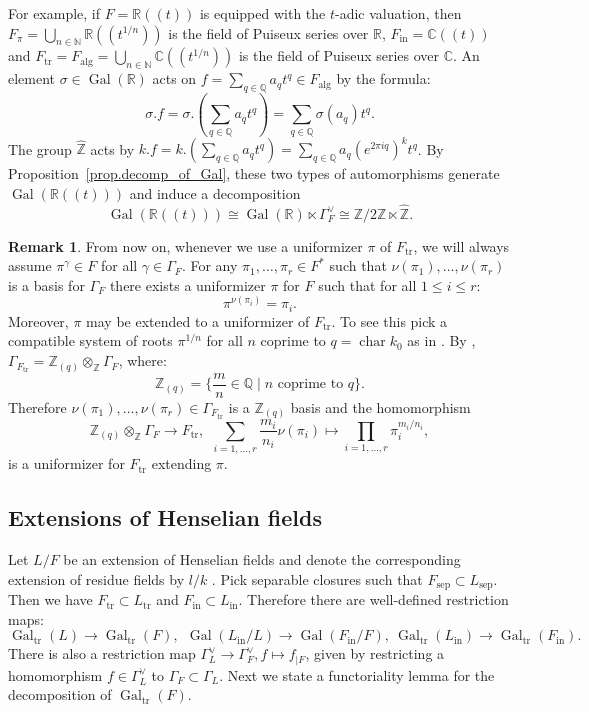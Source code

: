 \documentclass[12pt]{amsart}
\numberwithin{equation}{section}
\theoremstyle{definition}
\newtheorem{remark}[theorem]{Remark}
\newcommand{\bC}{\mathbb{C}}
\newcommand{\bN}{\mathbb{N}}
\newcommand{\bQ}{\mathbb{Q}}
\newcommand{\bR}{\mathbb{R}}
\newcommand{\bZ}{\mathbb{Z}}
\newcommand{\Gal}{\operatorname{Gal}}
\newcommand{\alg}{\operatorname{alg}}
\newcommand{\sep}{\operatorname{sep}}
\newcommand{\Char}{\operatorname{char}}
\newcommand{\tr}{\operatorname{tr}}
\newcommand{\Ftr}{F_{\tr}}
\newcommand{\Ltr}{L_{\tr}}
\newcommand{\oin}{\operatorname{in}}
\newcommand{\Fin}{F_{\oin}}
\newcommand{\Fsep}{F_{\sep}}
\newcommand{\Galtr}{\Gal_{\tr}}
\newcommand{\I}[1]{\Gamma_{#1}^{\vee}}
\begin{document}
For example, if $F = \bR(\!(t)\!)$ is equipped with the $t$-adic valuation, then $F_\pi = \bigcup_{n\in \bN}\bR(\!(t^{1/n})\!)$ is the field of Puiseux series over $\bR$, $\Fin = \bC(\!(t)\!)$ and $\Ftr = F_{\alg} = \bigcup_{n\in \bN} \bC(\!(t^{1/n})\!)$ is the field of Puiseux series over $\bC$. An element $\sigma \in\Gal(\bR)$ acts on $f = \sum_{q\in \bQ} a_q t^q \in F_{\alg}$ by the formula: $$\sigma.f = \sigma.(\sum_{q\in \bQ} a_{q} t^q) = \sum_{q\in \bQ} \sigma(a_q) t^q.$$ The group $\hat{\bZ}$ acts by $k.f=k.(\sum_{q\in \bQ} a_{q} t^q) = \sum_{q\in \bQ} a_q (e^{2\pi  iq })^{k}t^q$.  By Proposition~\ref{prop.decomp_of_Gal}, these two types of automorphisms generate $\Gal(\bR(\!(t)\!))$ and induce a decomposition $$\Gal(\bR(\!(t)\!)) \cong \Gal(\bR)\ltimes\I{F} \cong \bZ/2\bZ \ltimes \hat{\bZ}.$$

\begin{remark}\label{rem.uniformizers}
    From now on, whenever we use a uniformizer $\pi$ of $\Ftr$, we will always assume $\pi^{\gamma}\in F$ for all $\gamma\in \Gamma_F$.  For any $\pi_1,\dots,\pi_r\in F^*$ such that $\nu(\pi_1),\dots,\nu(\pi_r)$ is a basis for $\Gamma_F$ there exists a uniformizer $\pi$ for $F$ such that for all $1\leq i\leq r$:
    $$\pi^{\nu(\pi_i)} = \pi_i.$$
    Moreover, $\pi$ may be extended to a uniformizer of $\Ftr$. To see this pick a compatible system of roots $\pi^{1/n}$ for all $n$ coprime to $q = \Char k_0$ as in \cite[Lemma 3.2]{reichstein-scavia-specialization}. By \cite[Section 16.2]{efrat2006valuations}, $\Gamma_{\Ftr} = \bZ_{(q)}\otimes_{\bZ} \Gamma_F$, where:
    $$\bZ_{(q)} = \{ \frac{m}{n} \in \bQ \mid n \text{ coprime to } q\}.$$
    Therefore $\nu(\pi_1),\dots,\nu(\pi_r) \in \Gamma_{\Ftr}$ is a $\bZ_{(q)}$ basis and the homomorphism
    $$\bZ_{(q)}\otimes_{\bZ} \Gamma_F \to \Ftr, \ \ \sum_{i=1,\dots,r} \frac{m_i}{n_i} \nu(\pi_i) \mapsto \prod_{i=1,\dots,r} \pi_i^{m_i/n_i},$$
    is a uniformizer for $\Ftr$ extending $\pi$.
\end{remark}

\subsection{Extensions of Henselian fields}
Let $L/F$ be an extension of Henselian fields and denote the corresponding extension of residue fields by $l/k$ . Pick separable closures such that $\Fsep \subset L_{\sep}$. Then we have $\Ftr \subset \Ltr$ and $\Fin \subset L_{\oin}$. Therefore there are well-defined restriction maps:
$$\Galtr(L) \to \Galtr(F), \ \ \Gal(L_{\oin}/L) \to \Gal(\Fin/F), \ \Galtr(L_{\oin}) \to \Galtr(\Fin).$$
There is also a restriction map $\I{L}\to \I{F}, f\mapsto f_{|F}$, given by restricting a homomorphism $f\in \I{L}$ to $\Gamma_F\subset \Gamma_L$.
Next we state a functoriality lemma for the decomposition of $\Galtr(F)$.
\end{document}
